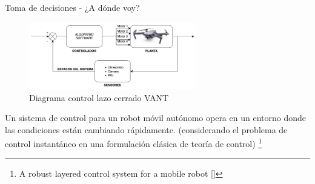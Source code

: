 \documentclass[
  24pt, %
  aspectratio=169, %
]{beamer}
\begin{document}
\begin{frame}{Toma de decisiones - ¿A dónde voy?}
  \begin{figure}[h]
    \includegraphics[width=0.65\textwidth]{control_drone.png}
    \caption{Diagrama control lazo cerrado VANT}
  \end{figure}
  \bigskip %
  \small Un sistema de control para un robot móvil autónomo opera en un entorno donde las condiciones están cambiando rápidamente. (considerando el problema de control instantáneo en una formulación clásica de teoría de control) \footnote{A robust layered control system for a mobile robot [\cite{brooks_robot}]}
  
\end{frame}
\end{document}
